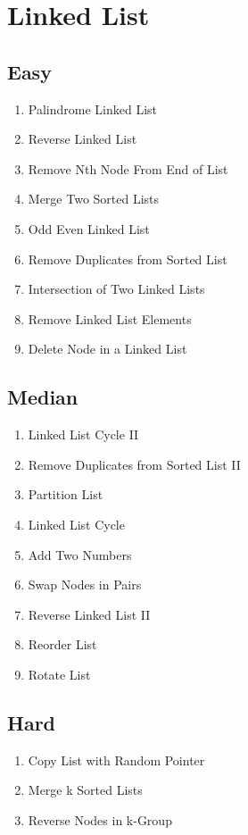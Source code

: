 \documentclass[DIV=calc, paper=a4, fontsize=11pt, twocolumn]{scrartcl}	 %
\begin{document}
\section*{Linked List}

\subsection*{Easy}
\begin{enumerate}
\item Palindrome Linked List \cite{234} 
\item Reverse Linked List \cite{206}
\item Remove Nth Node From End of List \cite{019}
\item Merge Two Sorted Lists \cite{021}
\item Odd Even Linked List \cite{328}
\item Remove Duplicates from Sorted List \cite{083}
\item Intersection of Two Linked Lists \cite{160}
\item Remove Linked List Elements \cite{203}
\item Delete Node in a Linked List \cite{237}
\end{enumerate}
\subsection*{Median}
\begin{enumerate}
\item Linked List Cycle II \cite{142}
\item Remove Duplicates from Sorted List II \cite{082}
\item Partition List \cite{086}
\item Linked List Cycle \cite{141}
\item Add Two Numbers \cite{002}
\item Swap Nodes in Pairs \cite{024}
\item Reverse Linked List II \cite{092}
\item Reorder List \cite{143}  
\item Rotate List \cite{061}
\end{enumerate}
\subsection*{Hard}
\begin{enumerate}
\item Copy List with Random Pointer \cite{138}
\item Merge k Sorted Lists   \cite{023}
\item Reverse Nodes in k-Group \cite{025}
\end{enumerate}
\end{document}
